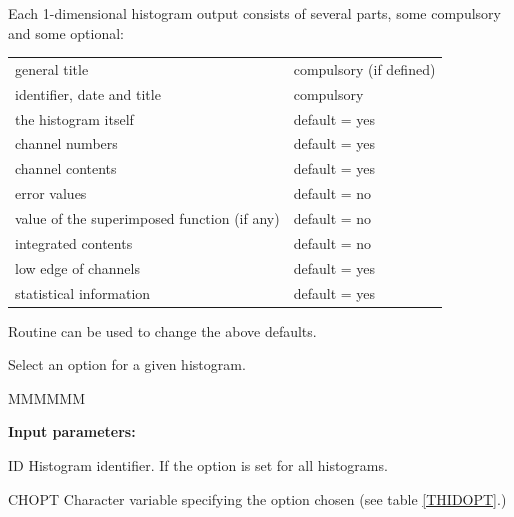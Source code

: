 Each 1-dimensional histogram output consists of several parts, some
compulsory and some optional:
\begin{center}
\begin{tabular}{|l@{\qquad}l|}
\hline
general title                              & compulsory (if defined)\\
identifier, date and title                 & compulsory             \\
the histogram itself                       & default = yes          \\
channel numbers                            & default = yes          \\
channel contents                           & default = yes          \\
error values                               & default = no           \\
value of the superimposed function (if any)& default = no           \\
integrated contents                        & default = no           \\
low edge of channels                       & default = yes          \\
statistical information                    & default = yes          \\
\hline
\end{tabular}
\end{center}
 
Routine  can be used to change the above defaults.
 
 
\Action Select an option for a given histogram.
 
\begin{DLttc}{MMMMMM}
\item[{\rm\bf Input parameters:}]
\item[ID]     Histogram identifier.
              If  the option is set for all histograms.
\item[CHOPT]  Character variable specifying the option chosen 
              (see table \ref{THIDOPT}.)
\end{DLttc}

